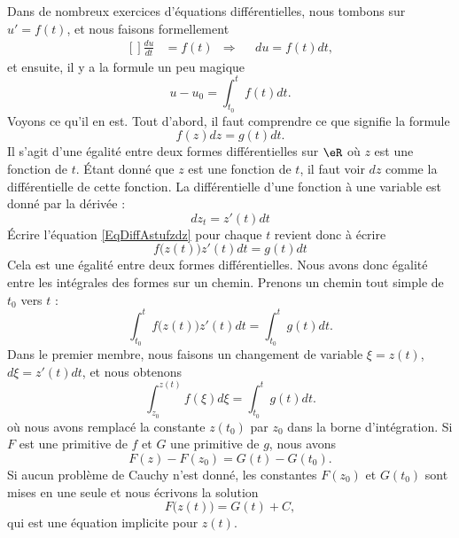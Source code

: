 Dans de nombreux exercices d'équations différentielles, nous tombons sur \( u'=f(t)\), et nous faisons formellement
\begin{equation}
	\begin{aligned}[]
		\frac{ du }{ dt } & =f(t) & \Rightarrow &  & du=f(t)dt,
	\end{aligned}
\end{equation}
et ensuite, il y a la formule un peu magique
\begin{equation}
	u-u_0=\int_{t_0}^tf(t)dt.
\end{equation}
Voyons ce qu'il en est. Tout d'abord, il faut comprendre ce que signifie la formule
\begin{equation}        \label{EqDiffAstufzdz}
	f(z)dz=g(t)dt.
\end{equation}
Il s'agit d'une égalité entre deux formes différentielles sur \( \eR\) où \( z\) est une fonction de \( t\).  Étant donné que \( z\) est une fonction de \( t\), il faut voir \( dz\) comme la différentielle de cette fonction. La différentielle d'une fonction à une variable est donné par la dérivée :
\begin{equation}
	dz_t=z'(t)dt
\end{equation}
Écrire l'équation \eqref{EqDiffAstufzdz} pour chaque \( t\) revient donc à écrire
\begin{equation}
	f\big( z(t) \big)z'(t)dt=g(t)dt
\end{equation}
Cela est une égalité entre deux formes différentielles. Nous avons donc égalité entre les intégrales des formes sur un chemin. Prenons un chemin tout simple de \( t_0\) vers \( t\) :
\begin{equation}
	\int_{t_0}^tf\big( z(t) \big)z'(t)dt=\int_{t_0}^tg(t)dt.
\end{equation}
Dans le premier membre, nous faisons un changement de variable \( \xi=z(t)\), \( d\xi=z'(t)dt\), et nous obtenons
\begin{equation}        \label{EqIntDiffAstuztz}
	\int_{z_0}^{z(t)}f(\xi)d\xi=\int_{t_0}^tg(t)dt.
\end{equation}
où nous avons remplacé la constante \( z(t_0)\) par \( z_0\) dans la borne d'intégration.  Si \( F\) est une primitive de \( f\) et \( G\) une primitive de \( g\), nous avons
\begin{equation}
	F(z)-F(z_0)=G(t)-G(t_0).
\end{equation}
Si aucun problème de Cauchy n'est donné, les constantes \( F(z_0)\) et \( G(t_0)\) sont mises en une seule et nous écrivons la solution
\begin{equation}
	F\big( z(t) \big)=G(t)+C,
\end{equation}
qui est une équation implicite pour \( z(t)\).

